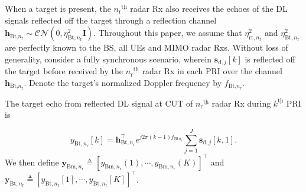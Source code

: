 \documentclass[10pt,journal]{IEEEtran}
\newcommand{\paren}[1]{\left({#1}\right)}
\newcommand{\bracket}[1]{{\left [{#1}\right ]}}
\newcommand{\ith}[1]    {{#1}^{\underline{\text{th}}}}
\newcommand{\rr}{_\mathrm{r}}
\newcommand{\target}{\mathrm{t}}
\theoremstyle{definition}
\begin{document}
When a target is present, the $\ith{n\rr}$ radar Rx also receives the echoes of the DL signals reflected off the target through a reflection channel $\mathbf{h}_{\textrm{Bt,}n\rr}\sim\mathcal{CN}\paren{0,\eta^2_{\textrm{Bt},n\rr}\mathbf{I}}$. Throughout this paper, we assume that $\eta^2_{\textrm{rt},n\rr}$ and $\eta^2_{\textrm{Bt},n\rr}$ are perfectly known to the BS, all UEs and MIMO radar Rxs. Without loss of generality, consider a fully synchronous scenario, wherein $\mathbf{s}_{\textrm{d},j}\bracket{k}$ is reflected off the target before received by %
the $\ith{n\rr}$ radar Rx in each PRI over the channel $\mathbf{h}_{\textrm{Bt,}n\rr}$.
Denote the target's normalized Doppler frequency by $f_{\textrm{Bt,}n\rr}$. 

The target echo from reflected DL signal at CUT of $\ith{n\rr}$ radar Rx during $\ith{k}$ PRI is\par\noindent\small
\begin{equation}
y_{\mathrm{Bt},n\rr}\bracket{k}=\mathbf{h}_{\mathrm{Bt},n\rr}^\top e^{j2\pi\paren{k-1} f_{\mathrm{Bt}n_\mathrm{r}}}
\sum_{j=1}^\mathit{J}\mathbf{s}_{\textrm{d},j}\bracket{k,1}.
\end{equation}\normalsize
We then define 
$\mathbf{y}_{\mathrm{Bm},n\rr}\triangleq\bracket{y_{\mathrm{Bm},n\rr}\paren{1},\cdots,y_{\mathrm{Bm},n\rr}\paren{\mathit{K}}}^\top$ and  $\mathbf{y}_{\mathrm{Bt},n\rr}\triangleq\bracket{y_{\mathrm{Bt,}n\rr}\bracket{1},\cdots,y_{\mathrm{Bt,}n\rr}\bracket{K}}^\top$.
\end{document}
